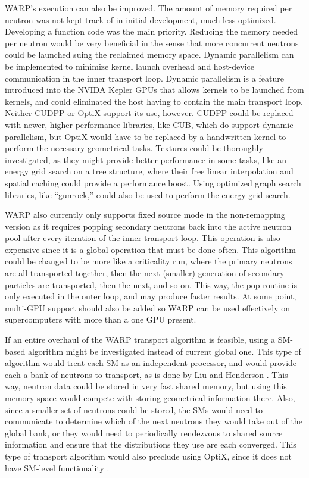 WARP's execution can also be improved.  The amount of memory required per neutron was not kept track of in initial development, much less optimized.  Developing a function code was the main priority.  Reducing the memory needed per neutron would be very beneficial in the sense that more concurrent neutrons could be launched suing the reclaimed memory space.  Dynamic parallelism can be implemented to minimize kernel launch overhead and host-device communication in the inner transport loop.  Dynamic parallelism is a feature introduced into the NVIDA Kepler GPUs that allows kernels to be launched from kernels, and could eliminated the host having to contain the main transport loop.  Neither CUDPP or OptiX support its use, however.  CUDPP could be replaced with newer, higher-performance libraries, like CUB, which do support dynamic parallelism, but OptiX would have to be replaced by a handwritten kernel to perform the necessary geometrical tasks.  Textures could be thoroughly investigated, as they might provide better performance in some tasks, like an energy grid search on a tree structure, where their free linear interpolation and spatial caching could provide a performance boost.    Using optimized graph search libraries, like ``gunrock,'' could also be used to perform the energy grid search.

WARP also currently only supports fixed source mode in the non-remapping version as it requires popping secondary neutrons back into the active neutron pool after every iteration of the inner transport loop.  This operation is also expensive since it is a global operation that must be done often.  This algorithm could be changed to be more like a criticality run, where the primary neutrons are all transported together, then the next (smaller) generation of secondary particles are transported, then the next, and so on.  This way, the pop routine is only executed in the outer loop, and may produce faster results.   At some point, multi-GPU support should also be added so WARP can be used effectively on supercomputers with more than a one GPU present.

If an entire overhaul of the WARP transport algorithm is feasible, using a SM-based algorithm might be investigated instead of current global one.  This type of algorithm would treat each SM as an independent processor, and would provide each a bank of neutrons to transport, as is done by Liu and Henderson \cite{tianyu,henderson}.   This way, neutron data could be stored in very fast shared memory, but using this memory space would compete with storing geometrical information there.  Also, since a smaller set of neutrons could be stored, the SMs would need to communicate to determine which of the next neutrons they would take out of the global bank, or they would need to periodically rendezvous to shared source information and ensure that the distributions they use are each converged.  This type of transport algorithm would also preclude using OptiX, since it does not have SM-level functionality \cite{optix}.

